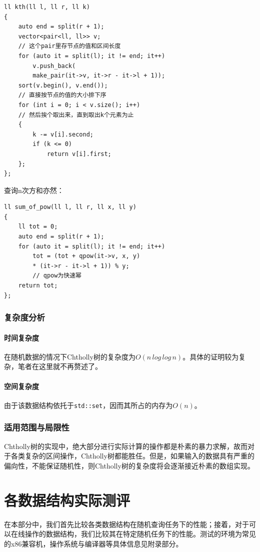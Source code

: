 \documentclass{cjc}
\begin{document}
\begin{lstlisting}
ll kth(ll l, ll r, ll k)
{
    auto end = split(r + 1);
    vector<pair<ll, ll>> v; 
    // 这个pair里存节点的值和区间长度
    for (auto it = split(l); it != end; it++)
        v.push_back(
        make_pair(it->v, it->r - it->l + 1));
    sort(v.begin(), v.end()); 
    // 直接按节点的值的大小排下序
    for (int i = 0; i < v.size(); i++) 
    // 然后挨个取出来，直到取出k个元素为止
    {
        k -= v[i].second;
        if (k <= 0)
            return v[i].first;
    };
};
\end{lstlisting}
查询n次方和亦然：
\begin{lstlisting}
ll sum_of_pow(ll l, ll r, ll x, ll y)
{
    ll tot = 0;
    auto end = split(r + 1);
    for (auto it = split(l); it != end; it++)
        tot = (tot + qpow(it->v, x, y) 
        * (it->r - it->l + 1)) % y; 
        // qpow为快速幂
    return tot;
};
\end{lstlisting}

\subsubsection{复杂度分析}
\paragraph{时间复杂度} 在随机数据的情况下Chtholly树的复杂度为$O(n\,log\,log\,n)$。具体的证明较为复杂，笔者在这里就不再赘述了。
\paragraph{空间复杂度} 由于该数据结构依托于\lstinline{std::set}，因而其所占的内存为$O(n)$。
\subsubsection{适用范围与局限性}
Chtholly树的实现中，绝大部分进行实际计算的操作都是朴素的暴力求解，故而对于各类复杂的区间操作，Chtholly树都能胜任。但是，如果输入的数据具有严重的偏向性，不能保证随机性，则Chtholly树的复杂度将会逐渐接近朴素的数组实现。

\section{各数据结构实际测评}

在本部分中，我们首先比较各类数据结构在随机查询任务下的性能；接着，对于可以在线操作的数据结构，我们比较其在特定随机任务下的性能。测试的环境为常见的x86兼容机，操作系统与编译器等具体信息见附录部分。
\end{document}
